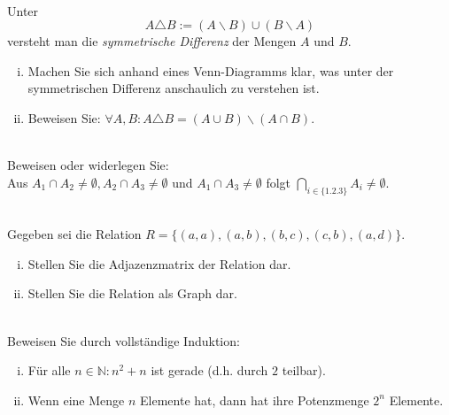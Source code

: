 \\
  Unter 
  \[A\triangle B:=(A\backslash B)\cup (B\backslash A)\] versteht man die \textit{symmetrische Differenz} der Mengen $A$ und $B$.
  \begin{enumerate}[(i)]
    \item Machen Sie sich anhand eines Venn-Diagramms klar, was unter der symmetrischen Differenz anschaulich zu verstehen ist.
    \item Beweisen Sie: $\forall A,B:A\triangle B=(A\cup B)\backslash(A\cap B)$.
  \end{enumerate}
 \\
Beweisen oder widerlegen Sie:\\
Aus $A_1\cap A_2\neq\emptyset, A_2\cap A_3\neq\emptyset$ und $A_1\cap A_3\neq\emptyset$ folgt $\bigcap_{i\in\{1.2.3\}}A_i\neq\emptyset$.

\\
Gegeben sei die Relation $R=\{(a,a),(a,b),(b,c),(c,b),(a,d)\}$.
\begin{enumerate}[(i)]
  \item Stellen Sie die Adjazenzmatrix der Relation dar.
  \item Stellen Sie die Relation als Graph dar.
\end{enumerate}

\\
Beweisen Sie durch vollständige Induktion:
\begin{enumerate}[(i)]
  \item Für alle $n\in\mathbb{N}:n^2+n$ ist gerade (d.h. durch $2$ teilbar).
  \item Wenn eine Menge $n$ Elemente hat, dann hat ihre Potenzmenge $2^n$ Elemente.
\end{enumerate}
